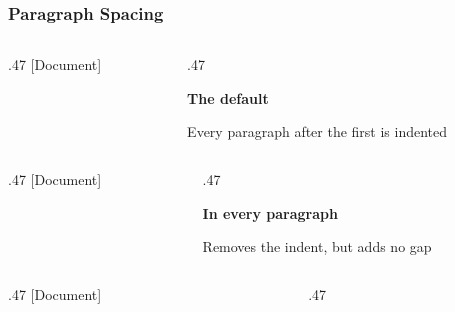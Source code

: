 \begin{frame}
    \frametitle{Paragraph Spacing}
    \begin{overprint}
            \begin{columns}[T, onlytextwidth]
                \begin{column}{.47\textwidth}
                    [Document]
                \end{column}
                \begin{column}{.47\textwidth}
                    {\large\bfseries The default\par}
                    \medskip
                    Every paragraph after the first is indented
                \end{column}
            \end{columns}
            \medskip
            \begin{columns}[T, onlytextwidth]
                \begin{column}{.47\textwidth}
                    [Document]
                \end{column}
                \begin{column}{.47\textwidth}
                    {\large\bfseries In every paragraph\par}
                    \medskip
                    Removes the indent, but adds no gap
                \end{column}
            \end{columns}
            \medskip
            \begin{columns}[T, onlytextwidth]
                \begin{column}{.47\textwidth}
                    [Document]
                \end{column}
                \begin{column}{.47\textwidth}

\end{column}
\end{columns}
\end{overprint}
\end{frame}
